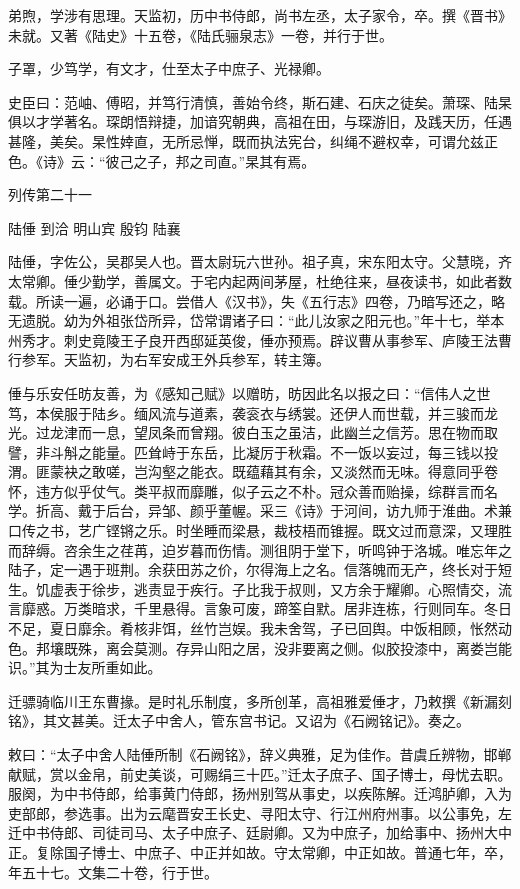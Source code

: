 \documentclass[12pt,UTF8]{ctexbook}
\begin{document}
弟煦，学涉有思理。天监初，历中书侍郎，尚书左丞，太子家令，卒。撰《晋书》未就。又著《陆史》十五卷，《陆氏骊泉志》一卷，并行于世。

子罩，少笃学，有文才，仕至太子中庶子、光禄卿。

史臣曰：范岫、傅昭，并笃行清慎，善始令终，斯石建、石庆之徒矣。萧琛、陆杲俱以才学著名。琛朗悟辩捷，加谙究朝典，高祖在田，与琛游旧，及践天历，任遇甚隆，美矣。杲性婞直，无所忌惮，既而执法宪台，纠绳不避权幸，可谓允兹正色。《诗》云：“彼己之子，邦之司直。”杲其有焉。





列传第二十一

陆倕 到洽 明山宾 殷钧 陆襄

陆倕，字佐公，吴郡吴人也。晋太尉玩六世孙。祖子真，宋东阳太守。父慧晓，齐太常卿。倕少勤学，善属文。于宅内起两间茅屋，杜绝往来，昼夜读书，如此者数载。所读一遍，必诵于口。尝借人《汉书》，失《五行志》四卷，乃暗写还之，略无遗脱。幼为外祖张岱所异，岱常谓诸子曰：“此儿汝家之阳元也。”年十七，举本州秀才。刺史竟陵王子良开西邸延英俊，倕亦预焉。辟议曹从事参军、庐陵王法曹行参军。天监初，为右军安成王外兵参军，转主簿。

倕与乐安任昉友善，为《感知己赋》以赠昉，昉因此名以报之曰：“信伟人之世笃，本侯服于陆乡。缅风流与道素，袭衮衣与绣裳。还伊人而世载，并三骏而龙光。过龙津而一息，望凤条而曾翔。彼白玉之虽洁，此幽兰之信芳。思在物而取譬，非斗斛之能量。匹耸峙于东岳，比凝厉于秋霜。不一饭以妄过，每三钱以投渭。匪蒙袂之敢嗟，岂沟壑之能衣。既蕴藉其有余，又淡然而无味。得意同乎卷怀，违方似乎仗气。类平叔而靡雕，似子云之不朴。冠众善而贻操，综群言而名学。折高、戴于后台，异邹、颜乎董幄。采三《诗》于河间，访九师于淮曲。术兼口传之书，艺广铿锵之乐。时坐睡而梁悬，裁枝梧而锥握。既文过而意深，又理胜而辞缛。咨余生之荏苒，迫岁暮而伤情。测徂阴于堂下，听鸣钟于洛城。唯忘年之陆子，定一遇于班荆。余获田苏之价，尔得海上之名。信落魄而无产，终长对于短生。饥虚表于徐步，逃责显于疾行。子比我于叔则，又方余于耀卿。心照情交，流言靡惑。万类暗求，千里悬得。言象可废，蹄筌自默。居非连栋，行则同车。冬日不足，夏日靡余。肴核非饵，丝竹岂娱。我未舍驾，子已回舆。中饭相顾，怅然动色。邦壤既殊，离会莫测。存异山阳之居，没非要离之侧。似胶投漆中，离娄岂能识。”其为士友所重如此。

迁骠骑临川王东曹掾。是时礼乐制度，多所创革，高祖雅爱倕才，乃敕撰《新漏刻铭》，其文甚美。迁太子中舍人，管东宫书记。又诏为《石阙铭记》。奏之。

敕曰：“太子中舍人陆倕所制《石阙铭》，辞义典雅，足为佳作。昔虞丘辨物，邯郸献赋，赏以金帛，前史美谈，可赐绢三十匹。”迁太子庶子、国子博士，母忧去职。服阕，为中书侍郎，给事黄门侍郎，扬州别驾从事史，以疾陈解。迁鸿胪卿，入为吏部郎，参选事。出为云麾晋安王长史、寻阳太守、行江州府州事。以公事免，左迁中书侍郎、司徒司马、太子中庶子、廷尉卿。又为中庶子，加给事中、扬州大中正。复除国子博士、中庶子、中正并如故。守太常卿，中正如故。普通七年，卒，年五十七。文集二十卷，行于世。
\end{document}
